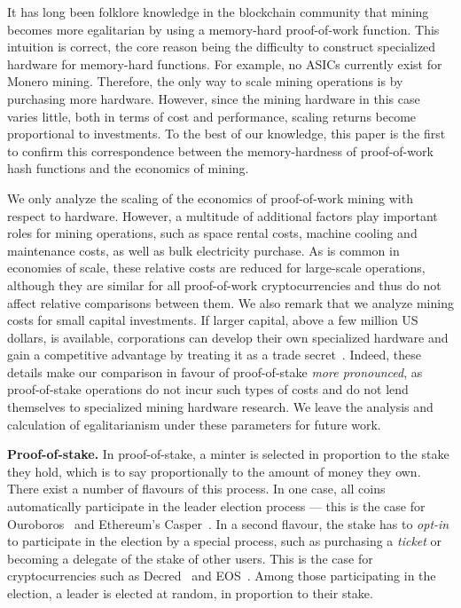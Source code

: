 It has long been folklore knowledge in the blockchain community that mining
becomes more egalitarian by using a memory-hard proof-of-work function. This
intuition is correct, the core reason being the difficulty to construct
specialized hardware for memory-hard functions. For example, no ASICs
currently exist for Monero mining.  Therefore, the only way to scale mining
operations is by purchasing more hardware. However, since the mining hardware
in this case varies little, both in terms of cost and performance, scaling
returns become proportional to investments.  To the best of our knowledge, this
paper is the first to confirm this correspondence between the
memory-hardness of proof-of-work hash functions and the economics of mining.

\begin{remark}\label{rmk:pow-scale}
We only analyze the scaling of the economics of proof-of-work mining with
respect to hardware. However, a multitude of
additional factors play important roles for mining operations, such as
space rental costs, machine cooling and maintenance costs, as well as bulk
electricity purchase.  As is common in economies of scale, these relative
costs are reduced for large-scale operations, although they are similar for
all proof-of-work cryptocurrencies and thus do not affect relative
comparisons between them. We also remark that we analyze mining costs for
small capital investments. If larger capital, \eg above a few million US
dollars, is available, corporations can develop their own specialized
hardware and gain a competitive advantage by treating it as a trade secret~\cite{taylor2013bitcoin}.
Indeed, these details make our comparison in favour of proof-of-stake
\emph{more pronounced}, as proof-of-stake operations do not incur such
types of costs and do not lend themselves to specialized mining hardware
research. We leave the analysis and calculation of egalitarianism under
these parameters for future work.
\end{remark}

\noindent\textbf{Proof-of-stake.}
In proof-of-stake, a minter is selected in proportion to the stake they hold,
which is to say proportionally to the amount of money they own. There exist a
number of flavours of this process. In one case, all coins automatically
participate in the leader election process --- this is the case for Ouroboros~\cite{C:KRDO17} and
Ethereum's Casper~\cite{buterin2017casper}. In a second flavour, the stake has
to \emph{opt-in} to participate in the election by a special process, such as
purchasing a \emph{ticket} or becoming a delegate of the stake of other users.
This is the case for cryptocurrencies such as Decred~\cite{decred} and EOS~\cite{eos}. Among those
participating in the election, a leader is elected at random, in proportion to
their stake.

